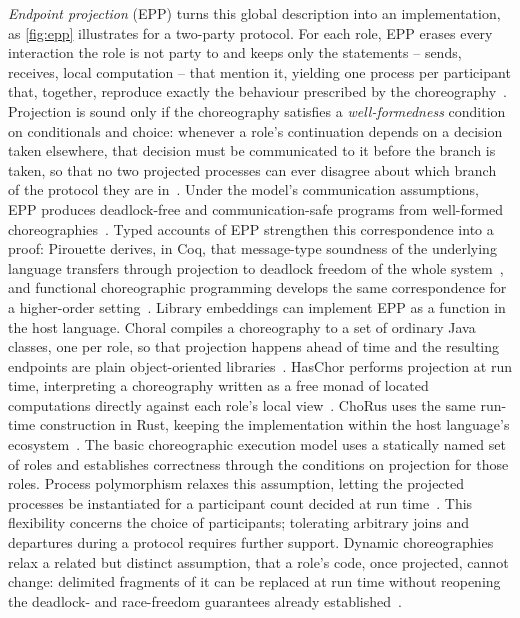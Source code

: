 \emph{Endpoint projection} (EPP) turns this global description into an implementation, as \cref{fig:epp} illustrates for a two-party protocol.
For each role, \ac{EPP} erases every interaction the role is not party to and keeps only the statements -- sends, receives, local computation -- that mention it,
yielding one process per participant that, together, reproduce exactly the behaviour prescribed by the choreography~\cite{10.1145/2429069.2429101}.
%
Projection is sound only if the choreography satisfies a \emph{well-formedness} condition on conditionals and choice:
whenever a role's continuation depends on a decision taken elsewhere,
that decision must be communicated to it before the branch is taken,
so that no two projected processes can ever disagree about which branch of the protocol they are in~\cite{10.1145/2429069.2429101,Montesi2023chor}.
%
Under the model's communication assumptions,
\ac{EPP} produces deadlock-free and communication-safe programs from well-formed choreographies~\cite{10.1145/2429069.2429101}.
%
Typed accounts of \ac{EPP} strengthen this correspondence into a proof:
Pirouette derives, in Coq, that message-type soundness of the underlying language transfers through projection to deadlock freedom of the whole system~\cite{10.1145/3498684},
and functional choreographic programming develops the same correspondence for a higher-order setting~\cite{10.1007/978-3-031-17715-6_15}.
%
Library embeddings can implement \ac{EPP} as a function in the host language.
%
Choral compiles a choreography to a set of ordinary Java classes, one per role, so that projection happens ahead of time and the resulting endpoints are plain object-oriented libraries~\cite{10.1145/3632398}.
%
HasChor performs projection at run time, interpreting a choreography written as a free monad of located computations directly against each role's local view~\cite{10.1145/3607849}.
%
ChoRus uses the same run-time construction in Rust,
keeping the implementation within the host language's ecosystem~\cite{kashiwa2024chorus}.
%
The basic choreographic execution model uses a statically named set of roles
and establishes correctness through the conditions on projection for those roles.
%
Process polymorphism relaxes this assumption,
letting the projected processes be instantiated for a participant count decided at run time~\cite{GRAVERSEN_HIRSCH_MONTESI_2024}.
This flexibility concerns the choice of participants;
tolerating arbitrary joins and departures during a protocol requires further support.
%
Dynamic choreographies relax a related but distinct assumption,
that a role's code, once projected, cannot change: delimited fragments of it can be replaced at run time without reopening the deadlock- and race-freedom guarantees already established~\cite{Preda:2017}.

